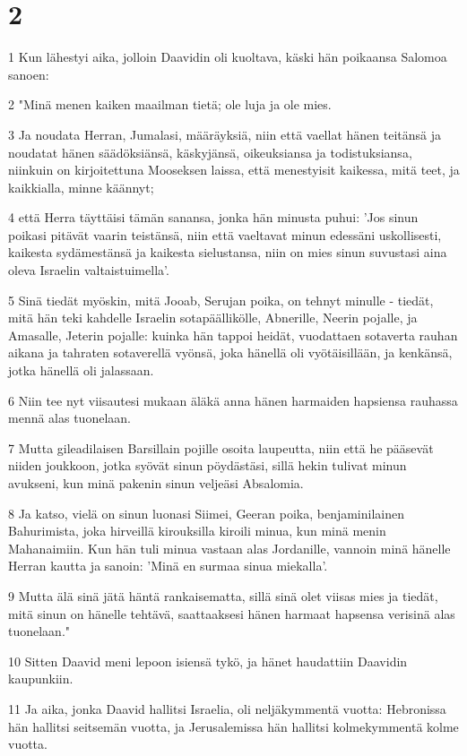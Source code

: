\chapter{2}

\par 1 Kun lähestyi aika, jolloin Daavidin oli kuoltava, käski hän poikaansa Salomoa sanoen:
\par 2 "Minä menen kaiken maailman tietä; ole luja ja ole mies.
\par 3 Ja noudata Herran, Jumalasi, määräyksiä, niin että vaellat hänen teitänsä ja noudatat hänen säädöksiänsä, käskyjänsä, oikeuksiansa ja todistuksiansa, niinkuin on kirjoitettuna Mooseksen laissa, että menestyisit kaikessa, mitä teet, ja kaikkialla, minne käännyt;
\par 4 että Herra täyttäisi tämän sanansa, jonka hän minusta puhui: 'Jos sinun poikasi pitävät vaarin teistänsä, niin että vaeltavat minun edessäni uskollisesti, kaikesta sydämestänsä ja kaikesta sielustansa, niin on mies sinun suvustasi aina oleva Israelin valtaistuimella'.
\par 5 Sinä tiedät myöskin, mitä Jooab, Serujan poika, on tehnyt minulle - tiedät, mitä hän teki kahdelle Israelin sotapäällikölle, Abnerille, Neerin pojalle, ja Amasalle, Jeterin pojalle: kuinka hän tappoi heidät, vuodattaen sotaverta rauhan aikana ja tahraten sotaverellä vyönsä, joka hänellä oli vyötäisillään, ja kenkänsä, jotka hänellä oli jalassaan.
\par 6 Niin tee nyt viisautesi mukaan äläkä anna hänen harmaiden hapsiensa rauhassa mennä alas tuonelaan.
\par 7 Mutta gileadilaisen Barsillain pojille osoita laupeutta, niin että he pääsevät niiden joukkoon, jotka syövät sinun pöydästäsi, sillä hekin tulivat minun avukseni, kun minä pakenin sinun veljeäsi Absalomia.
\par 8 Ja katso, vielä on sinun luonasi Siimei, Geeran poika, benjaminilainen Bahurimista, joka hirveillä kirouksilla kiroili minua, kun minä menin Mahanaimiin. Kun hän tuli minua vastaan alas Jordanille, vannoin minä hänelle Herran kautta ja sanoin: 'Minä en surmaa sinua miekalla'.
\par 9 Mutta älä sinä jätä häntä rankaisematta, sillä sinä olet viisas mies ja tiedät, mitä sinun on hänelle tehtävä, saattaaksesi hänen harmaat hapsensa verisinä alas tuonelaan."
\par 10 Sitten Daavid meni lepoon isiensä tykö, ja hänet haudattiin Daavidin kaupunkiin.
\par 11 Ja aika, jonka Daavid hallitsi Israelia, oli neljäkymmentä vuotta: Hebronissa hän hallitsi seitsemän vuotta, ja Jerusalemissa hän hallitsi kolmekymmentä kolme vuotta.

